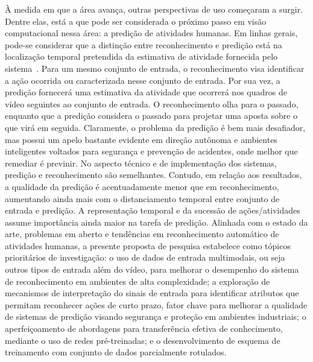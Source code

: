 À medida em que a área avança, outras perspectivas de uso começaram a surgir. Dentre elas, está a que pode ser considerada o próximo passo em visão computacional nessa área: a predição de atividades humanas. Em linhas gerais, pode-se considerar que a distinção entre reconhecimento e predição está na localização temporal pretendida da estimativa de atividade fornecida pelo sistema~\parencite{kongr-2018}. Para um mesmo conjunto de entrada, o reconhecimento visa identificar a ação ocorrida ou caracterizada nesse conjunto de entrada. Por sua vez, a predição fornecerá uma estimativa da atividade que ocorrerá nos quadros de vídeo seguintes ao conjunto de entrada. O reconhecimento olha para o passado, enquanto que a predição considera o passado para projetar uma aposta sobre o que virá em seguida. Claramente, o problema da predição é bem mais desafiador, mas possui um apelo bastante evidente em direção autônoma e ambientes inteligentes voltados para segurança e prevenção de acidentes, onde melhor que remediar é previnir. No aspecto técnico e de implementação dos sistemas, predição e reconhecimento são semelhantes. Contudo, em relação aos resultados, a qualidade da predição é acentuadamente menor que em reconhecimento, aumentando ainda mais com o distanciamento temporal entre conjunto de entrada e predição. A representação temporal e da sucessão de ações/atividades assume importância ainda maior na tarefa de predição.
Alinhada com o estado da arte, problemas em aberto e tendências em reconhecimento automático de atividades humanas, a presente proposta de pesquisa estabelece como tópicos prioritários de investigação: o uso de dados de entrada  multimodais, ou seja outros tipos de entrada além do vídeo, para melhorar o desempenho do sistema de reconhecimento em ambientes de alta complexidade; a exploração de mecanismos de interpretação do sinais de entrada para identificar atributos que permitam reconhecer ações de curto prazo, fator chave para melhorar a qualidade de sistemas de predição visando segurança e proteção em ambientes industriais; o aperfeiçoamento de abordagens para transferência efetiva de conhecimento, mediante o uso de redes pré-treinadas; e o desenvolvimento de esquema de treinamento com conjunto de dados parcialmente rotulados.

